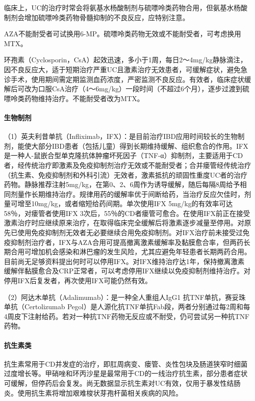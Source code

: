 临床上，UC的治疗时常会将氨基水杨酸制剂与硫嘌呤类药物合用，但氨基水杨酸制剂会增加硫嘌呤类药物骨髓抑制的不良反应，应特别注意。

AZA不能耐受者可试换用6-MP。硫嘌呤类药物无效或不能耐受者，可考虑换用MTX。

环孢素（Cyclosporin，CsA）起效迅速，多小于1周，每日2～4mg/kg静脉滴注，因不良反应大，适于短期治疗严重UC且激素治疗无效患者，可缓解症状，避免急诊手术，使用期间需定期监测血药浓度，严密监测不良反应。有效者，临床症状缓解后可改为口服CsA治疗（4～6mg/kg）一段时间（不超过6个月），逐步过渡到硫嘌呤类药物维持治疗。不能耐受者改为MTX。
\paragraph{生物制剂}

（1）英夫利昔单抗（Infliximab，IFX）：是目前治疗IBD应用时间较长的生物制剂，能使大部分IBD患者（包括儿童）得到长期维持缓解、组织愈合的作用。IFX是一种人-鼠嵌合型单克隆抗体肿瘤坏死因子（TNF-α）抑制剂，主要适用于CD者，经传统治疗即激素及免疫抑制剂治疗无效或不能耐受者；合并瘘管经传统治疗（抗生素、免疫抑制剂和外科引流）无效者，激素抵抗的顽固性重度UC者的治疗药物。静脉推荐注射5mg/kg，在第0、2、6周作为诱导缓解，随后每隔8周给予相同剂量作长期维持治疗。规律用药的缓解率优于间断给药，当治疗反应欠佳时，剂量可增至10mg/kg，或者缩短给药间期。单次使用IFX
5mg/kg的有效率可达58％，对瘘管者使用IFX
3次后，55％的CD者瘘管可愈合。在使用IFX前正在接受激素治疗时应继续原来治疗，在取得临床完全缓解后将激素逐步减量至停用。对原先已使用免疫抑制剂无效者无必要继续合用免疫抑制剂。对IFX治疗前未接受过免疫抑制剂治疗者，IFX与AZA合用可提高撤离激素缓解率及黏膜愈合率，但两药长期合用可增加机会感染和淋巴瘤的发生风险，尤其应避免年轻患者长期两药合用。目前尚无足够资料提出何时可以停用IFX。对IFX维持治疗达1年，保持撤离激素缓解伴黏膜愈合及CRP正常者，可以考虑停用IFX继续以免疫抑制剂维持治疗。对停用IFX后复发者，再次使用IFX可能仍然有效。

（2）阿达木单抗（Adalimumab）：是一种全人重组人IgG{1}
抗TNF单抗，赛妥珠单抗（Certolizumab
Pegol）是人源化抗TNF单抗Fab段，两者分别通过每2周和每4周皮下注射给药。若对一种抗TNF药物无反应或不耐受，仍可尝试另一种抗TNF药物。
\paragraph{抗生素类}

抗生素常用于CD并发症的治疗，即肛周病变、瘘管、炎性包块及肠道狭窄时细菌过度增长等。甲硝唑和环丙沙星是最常用于CD的一线治疗抗生素，部分患者症状可缓解，但停药后会复发。尚无数据显示抗生素对UC有效，仅用于暴发性结肠炎。使用抗生素将增加艰难梭状芽孢杆菌相关疾病的风险。


